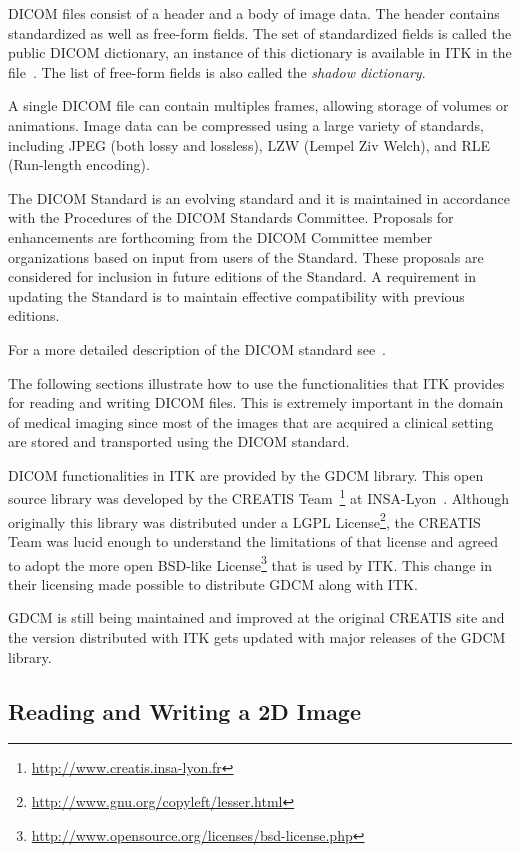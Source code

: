 DICOM files consist of a header and a body of image data. The header contains
standardized as well as free-form fields. The set of standardized fields is
called the public DICOM dictionary, an instance of this dictionary is available
in ITK in the file~.  The list of
free-form fields is also called the \emph{shadow dictionary}.

A single DICOM file can contain multiples frames, allowing storage of volumes
or animations. Image data can be compressed using a large variety of standards,
including JPEG (both lossy and lossless), LZW (Lempel Ziv Welch), and RLE
(Run-length encoding).

The DICOM Standard is an evolving standard and it is maintained in accordance
with the Procedures of the DICOM Standards Committee. Proposals for
enhancements are forthcoming from the DICOM Committee member organizations
based on input from users of the Standard. These proposals are considered for
inclusion in future editions of the Standard. A requirement in updating the
Standard is to maintain effective compatibility with previous editions.

For a more detailed description of the DICOM standard see~\cite{DICOMStandard}.

The following sections illustrate how to use the functionalities that ITK
provides for reading and writing DICOM files. This is extremely important in
the domain of medical imaging since most of the images that are acquired a
clinical setting are stored and transported using the DICOM standard.

DICOM functionalities in ITK are provided by the GDCM library. This open source
library was developed by the CREATIS
Team~\footnote{\url{http://www.creatis.insa-lyon.fr}} at
INSA-Lyon~\cite{CreatisINSA-Lyon}.  Although originally this library was
distributed under a LGPL
License\footnote{\url{http://www.gnu.org/copyleft/lesser.html}}, the CREATIS Team was
lucid enough to understand the limitations of that license and agreed to adopt
the more open BSD-like
License\footnote{\url{http://www.opensource.org/licenses/bsd-license.php}} that is
used by ITK. This change in their licensing made possible to distribute GDCM
along with ITK.

GDCM is still being maintained and improved at the original CREATIS site and
the version distributed with ITK gets updated with major releases of the GDCM
library.

\subsection{Reading and Writing a 2D Image}
\label{DicomImageReadWrite}
%

